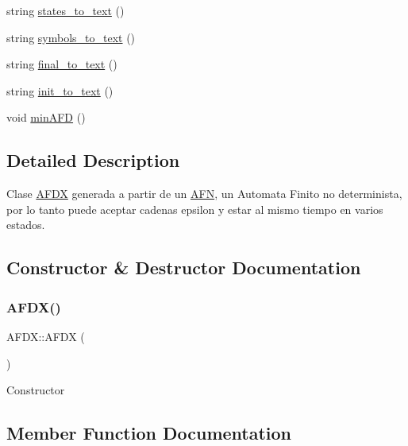 \begin{DoxyCompactItemize}
$$\item 
string \hyperlink{class_a_f_d_x_a1fa780c283bf7bafbc63c25102f9ae69}{states\+\_\+to\+\_\+text} ()
\item 
string \hyperlink{class_a_f_d_x_a9b8bedc996a82d6539188d3acb573940}{symbols\+\_\+to\+\_\+text} ()
\item 
string \hyperlink{class_a_f_d_x_a65d0f9d058236fd49de2ecec65dc35ef}{final\+\_\+to\+\_\+text} ()
\item 
string \hyperlink{class_a_f_d_x_a73888a711ee57d75df9069f70bc06815}{init\+\_\+to\+\_\+text} ()
\item 
void \hyperlink{class_a_f_d_x_aba731125afd626a8dbdab726dbd441eb}{min\+A\+FD} ()
\end{DoxyCompactItemize}


\subsection{Detailed Description}
Clase \hyperlink{class_a_f_d_x}{A\+F\+DX} generada a partir de un \hyperlink{class_a_f_n}{A\+FN}, un Automata Finito no determinista, por lo tanto puede aceptar cadenas epsilon y estar al mismo tiempo en varios estados. 

\subsection{Constructor \& Destructor Documentation}
\hypertarget{class_a_f_d_x_a4abb1326f70153217b6f27dc08135e5d}{}\label{class_a_f_d_x_a4abb1326f70153217b6f27dc08135e5d} 
\subsubsection{\texorpdfstring{A\+F\+D\+X()}{AFDX()}}
{\footnotesize\ttfamily A\+F\+D\+X\+::\+A\+F\+DX (\begin{DoxyParamCaption}{ }\end{DoxyParamCaption})}

Constructor 

\subsection{Member Function Documentation}
\hypertarget{class_a_f_d_x_aaf36a335cbb6d03b46993dc01355f756}{}\label{class_a_f_d_x_aaf36a335cbb6d03b46993dc01355f756} 
